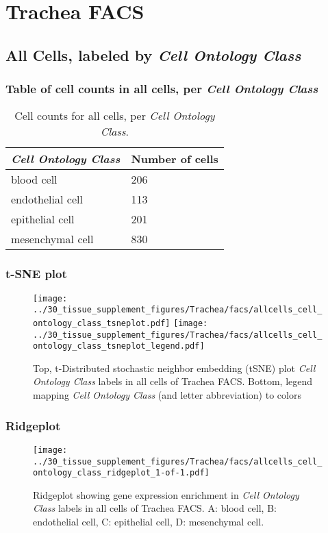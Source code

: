 \clearpage
\section{Trachea FACS}

\subsection{All Cells, labeled by \emph{Cell Ontology Class}}
\subsubsection{Table of cell counts in all cells, per \emph{Cell Ontology Class}}\begin{table}[h]
\centering
\label{my-label}
\begin{tabular}{@{}ll@{}}
\toprule

\emph{Cell Ontology Class}& Number of cells \\ \midrule
blood cell & 206 \\

endothelial cell & 113 \\

epithelial cell & 201 \\

mesenchymal cell & 830 \\
\bottomrule
\end{tabular}
\caption{Cell counts for all cells, per \emph{Cell Ontology Class}.}
\end{table}

\clearpage
\subsubsection{t-SNE plot}
\begin{figure}[h]
\centering
\texttt{[image: ../30\_tissue\_supplement\_figures/Trachea/facs/allcells\_cell\_ontology\_class\_tsneplot.pdf]}
\texttt{[image: ../30\_tissue\_supplement\_figures/Trachea/facs/allcells\_cell\_ontology\_class\_tsneplot\_legend.pdf]}
\caption{Top, t-Distributed stochastic neighbor embedding (tSNE) plot  \emph{Cell Ontology Class} labels in all cells of Trachea FACS. Bottom, legend mapping \emph{Cell Ontology Class} (and letter abbreviation) to colors}
\end{figure}


\clearpage

\subsubsection{Ridgeplot}
\begin{figure}[h]
\centering
\texttt{[image: ../30\_tissue\_supplement\_figures/Trachea/facs/allcells\_cell\_ontology\_class\_ridgeplot\_1-of-1.pdf]}

\caption{ Ridgeplot  showing gene expression enrichment in \emph{Cell Ontology Class} labels in all cells of Trachea FACS. A: blood cell, B: endothelial cell, C: epithelial cell, D: mesenchymal cell.}
\end{figure}


